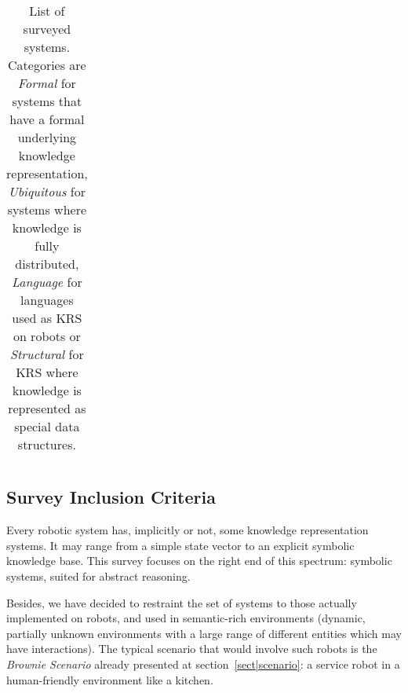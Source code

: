 \begin{landscape}
\begin{table}
\begin{center}
\begin{tabular}{p{2.2cm}p{1.6cm}p{4cm}lp{2.4cm}p{3.4cm}p{1.5cm}}

\bottomrule

\end{tabular}
\end{center}

\caption{List of surveyed systems. Categories are \emph{Formal} for systems
that have a formal underlying knowledge representation, \emph{Ubiquitous} for
systems where knowledge is fully distributed, \emph{Language} for languages
used as KRS on robots or \emph{Structural} for KRS where knowledge is
represented as special data structures.}

\label{table|surveyed-systems}
\end{table}
\end{landscape}

\subsection*{Survey Inclusion Criteria}
\label{sect|inclusion-criteria}

Every robotic system has, implicitly or not, some knowledge representation
systems. It may range from a simple state vector to an explicit symbolic
knowledge base.  This survey focuses on the right end of this spectrum:
symbolic systems, suited for abstract reasoning.

Besides, we have decided to restraint the set of systems to those actually
implemented on robots, and used in semantic-rich environments (\ie dynamic,
partially unknown environments with a large range of different entities which
may have interactions). The typical scenario that would involve such robots
is the \emph{Brownie Scenario} already presented at
section~\ref{sect|scenario}: a service robot in a human-friendly environment
like a kitchen.


